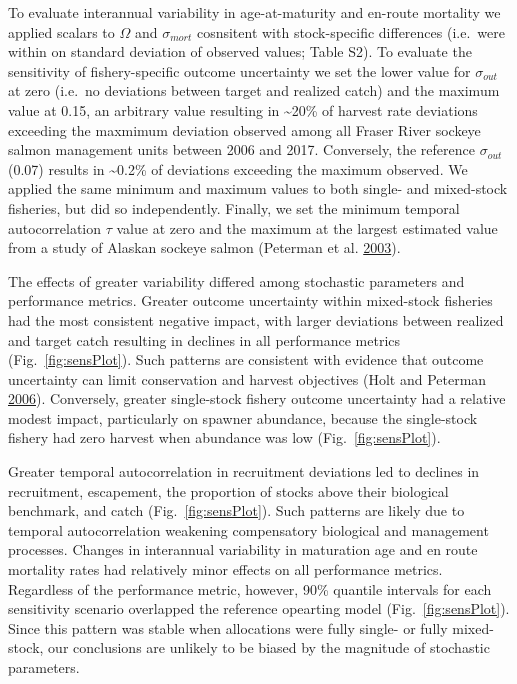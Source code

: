 \documentclass[11pt]{book}
\begin{document}
To evaluate interannual variability in age-at-maturity and en-route mortality we applied scalars to \(\Omega\) and \(\sigma_{mort}\) cosnsitent with stock-specific differences (i.e.~were within on standard deviation of observed values; Table S2). To evaluate the sensitivity of fishery-specific outcome uncertainty we set the lower value for \(\sigma_{out}\) at zero (i.e.~no deviations between target and realized catch) and the maximum value at 0.15, an arbitrary value resulting in \textasciitilde{}20\% of harvest rate deviations exceeding the maxmimum deviation observed among all Fraser River sockeye salmon management units between 2006 and 2017. Conversely, the reference \(\sigma_{out}\) (0.07) results in \textasciitilde{}0.2\% of deviations exceeding the maximum observed. We applied the same minimum and maximum values to both single- and mixed-stock fisheries, but did so independently. Finally, we set the minimum temporal autocorrelation \(\tau\) value at zero and the maximum at the largest estimated value from a study of Alaskan sockeye salmon (Peterman et al. \protect\hyperlink{ref-Peterman2003}{2003}).

The effects of greater variability differed among stochastic parameters and performance metrics. Greater outcome uncertainty within mixed-stock fisheries had the most consistent negative impact, with larger deviations between realized and target catch resulting in declines in all performance metrics (Fig.~\ref{fig:sensPlot}). Such patterns are consistent with evidence that outcome uncertainty can limit conservation and harvest objectives (Holt and Peterman \protect\hyperlink{ref-Holt2006}{2006}). Conversely, greater single-stock fishery outcome uncertainty had a relative modest impact, particularly on spawner abundance, because the single-stock fishery had zero harvest when abundance was low (Fig.~\ref{fig:sensPlot}).

Greater temporal autocorrelation in recruitment deviations led to declines in recruitment, escapement, the proportion of stocks above their biological benchmark, and catch (Fig.~\ref{fig:sensPlot}). Such patterns are likely due to temporal autocorrelation weakening compensatory biological and management processes. Changes in interannual variability in maturation age and en route mortality rates had relatively minor effects on all performance metrics. Regardless of the performance metric, however, 90\% quantile intervals for each sensitivity scenario overlapped the reference opearting model (Fig.~\ref{fig:sensPlot}). Since this pattern was stable when allocations were fully single- or fully mixed-stock, our conclusions are unlikely to be biased by the magnitude of stochastic parameters.
\end{document}
